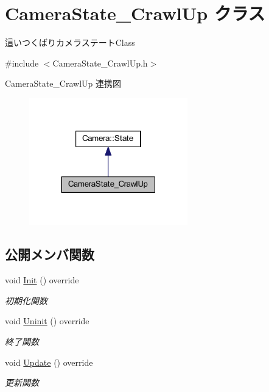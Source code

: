 \hypertarget{class_camera_state___crawl_up}{}\section{Camera\+State\+\_\+\+Crawl\+Up クラス}
\label{class_camera_state___crawl_up}


這いつくばりカメラステート\+Class  




{\ttfamily \#include $<$Camera\+State\+\_\+\+Crawl\+Up.\+h$>$}



Camera\+State\+\_\+\+Crawl\+Up 連携図\nopagebreak
\begin{figure}[H]
\begin{center}
\leavevmode
\includegraphics[width=195pt]{class_camera_state___crawl_up__coll__graph}
\end{center}
\end{figure}
\subsection*{公開メンバ関数}
\begin{DoxyCompactItemize}
\item 
void \mbox{\hyperlink{class_camera_state___crawl_up_a5b0ed82fd39c7dfe46e36ab151dcd2a1}{Init}} () override
\begin{DoxyCompactList}\small\item\em 初期化関数 \end{DoxyCompactList}\item 
void \mbox{\hyperlink{class_camera_state___crawl_up_a046ec18a91e31b210ae000133fa6113a}{Uninit}} () override
\begin{DoxyCompactList}\small\item\em 終了関数 \end{DoxyCompactList}\item 
void \mbox{\hyperlink{class_camera_state___crawl_up_a222f184d961d736f86dc4b2a3b227f8e}{Update}} () override
\begin{DoxyCompactList}\small\item\em 更新関数 \end{DoxyCompactList}\end{DoxyCompactItemize}
